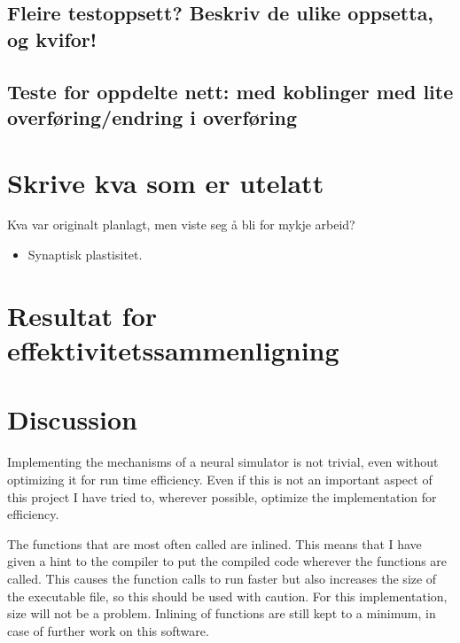 	\subsection{Fleire testoppsett? Beskriv de ulike oppsetta, og kvifor!}
	\subsection{Teste for oppdelte nett: med koblinger med lite overføring/endring i overføring}

\section{Skrive kva som er utelatt} %
Kva var originalt planlagt, men viste seg å bli for mykje arbeid?

\begin{itemize}
 	\item Synaptisk plastisitet.
\end{itemize}



\section{Resultat for effektivitetssammenligning}





\section{Discussion}

Implementing the mechanisms of a neural simulator is not trivial, even without optimizing it for run time efficiency.
Even if this is not an important aspect of this project I have tried to, wherever possible, optimize the implementation for efficiency.

The functions that are most often called are inlined. This means that I have given a hint to the compiler to put the compiled code wherever the functions are called.
This causes the function calls to run faster but also increases the size of the executable file, so this should be used with caution. %
For this implementation, size will not be a problem. %
Inlining of functions are still kept to a minimum, in case of further work on this software. %

